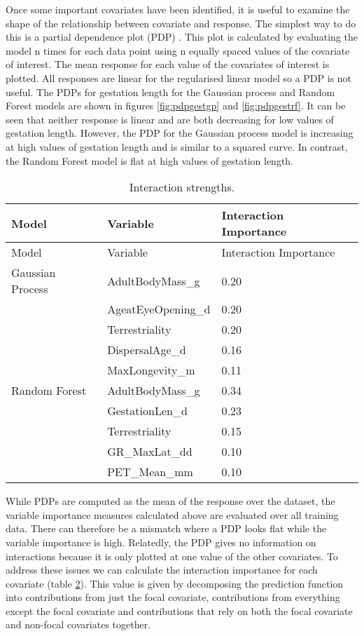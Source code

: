 \documentclass[10pt,]{article}
\begin{document}
Once some important covariates have been identified, it is useful to examine the shape of the relationship between covariate and response.
The simplest way to do this is a partial dependence plot (PDP) \citep{friedman2001greedy}.
This plot is calculated by evaluating the model n times for each data point using n equally spaced values of the covariate of interest.
The mean response for each value of the covariates of interest is plotted.
All responses are linear for the regularised linear model so a PDP is not useful.
The PDPs for gestation length for the Gaussian process and Random Forest models are shown in figures \ref{fig:pdpgestgp} and \ref{fig:pdpgestrf}.
It can be seen that neither response is linear and are both decreasing for low values of gestation length.
However, the PDP for the Gaussian process model is increasing at high values of gestation length and is similar to a squared curve.
In contrast, the Random Forest model is flat at high values of gestation length.

\begin{table}[t!]
\begin{longtable}[c]{@{}lll@{}}
\caption{Interaction strengths. \label{tbl:interimp}}\tabularnewline
\toprule
Model & Variable & Interaction Importance\tabularnewline
\midrule
\endfirsthead
\toprule
Model & Variable & Interaction Importance\tabularnewline
\midrule
\endhead
Gaussian Process & AdultBodyMass\_g & 0.20\tabularnewline
& AgeatEyeOpening\_d & 0.20\tabularnewline
& Terrestriality & 0.20\tabularnewline
& DispersalAge\_d & 0.16\tabularnewline
& MaxLongevity\_m & 0.11\tabularnewline
Random Forest & AdultBodyMass\_g & 0.34\tabularnewline
& GestationLen\_d & 0.23\tabularnewline
& Terrestriality & 0.15\tabularnewline
& GR\_MaxLat\_dd & 0.10\tabularnewline
& PET\_Mean\_mm & 0.10\tabularnewline
\bottomrule
\end{longtable}
\end{table}



While PDPs are computed as the mean of the response over the dataset, the variable importance measures calculated above are evaluated over all training data.
There can therefore be a mismatch where a PDP looks flat while the variable importance is high.
Relatedly, the PDP gives no information on interactions because it is only plotted at one value of the other covariates.
To address these issues we can calculate the interaction importance for each covariate (table \ref{tbl:interimp}).
This value is given by decomposing the prediction function into contributions from just the focal covariate, contributions from everything except the focal covariate and contributions that rely on both the focal covariate and non-focal covariates together.
\end{document}
